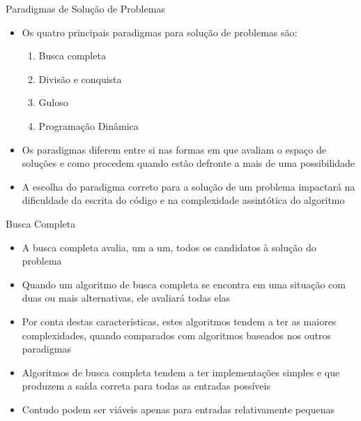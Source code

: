 
\begin{frame}[fragile]{Paradigmas de Solução de Problemas}

    \begin{itemize}
        \item Os quatro principais paradigmas para solução de problemas são:

        \begin{enumerate}
            \item Busca completa
            \item Divisão e conquista
            \item Guloso
            \item Programação Dinâmica
        \end{enumerate}

        \item Os paradigmas diferem entre si nas formas em que avaliam o espaço de soluções e
            como procedem quando estão defronte a mais de uma possibilidade

        \item A escolha do paradigma correto para a solução de um problema impactará na dificuldade
            da escrita do código e na complexidade assintótica do algoritmo
    \end{itemize}

\end{frame}

\begin{frame}[fragile]{Busca Completa}

    \begin{itemize}
        \item A busca completa avalia, um a um, todos os candidatos à solução do problema

        \item Quando um algoritmo de busca completa se encontra em uma situação com duas ou
            mais alternativas, ele avaliará todas elas

        \item Por conta destas características, estes algoritmos tendem a ter as maiores
            complexidades, quando comparados com algoritmos baseados nos outros paradigmas

        \item Algoritmos de busca completa tendem a ter implementações simples e que produzem a
            saída correta para todas as entradas possíveis

        \item Contudo podem ser viáveis apenas para entradas relativamente pequenas
    \end{itemize}

\end{frame}

